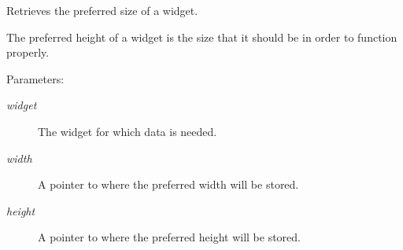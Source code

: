 Retrieves the preferred size of a widget. 

The preferred height of a widget is the size that it should be in order to function properly.

\begin{Desc}
\item[Parameters:]
\begin{description}
\item[{\em widget}]The widget for which data is needed. \item[{\em width}]A pointer to where the preferred width will be stored. \item[{\em height}]A pointer to where the preferred height will be stored. \end{description}
\end{Desc}
